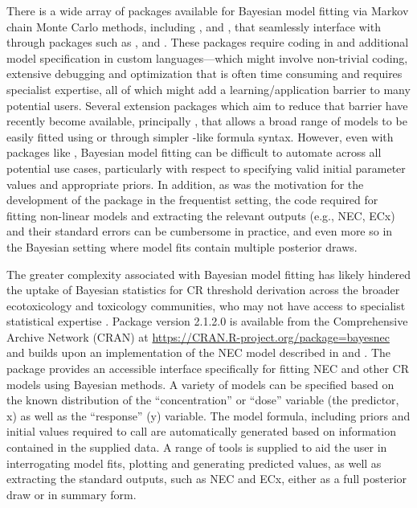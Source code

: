 \documentclass[
  shortnames]{jss}
\begin{document}
There is a wide array of packages available for Bayesian model fitting via Markov chain Monte Carlo methods, including  \citep{Lunn2000},  \citep{Plummer2003} and  \citep{Carpenter2017}, that seamlessly interface with  through packages such as ,  \citep{Su2015} and  \citep{rstan2021}. These packages require coding in  and additional model specification in custom languages---which might involve non-trivial coding, extensive debugging and optimization that is often time consuming and requires specialist expertise, all of which might add a learning/application barrier to many potential users. Several extension packages which aim to reduce that barrier have recently become available, principally  \citep{Burkner2017}, that allows a broad range of models to be easily fitted using  \citep{rstan2021} or  \citep{cmdstanr2022} through simpler -like formula syntax. However, even with packages like , Bayesian model fitting can be difficult to automate across all potential use cases, particularly with respect to specifying valid initial parameter values and appropriate priors. In addition, as was the motivation for the development of the  package in the frequentist setting, the  code required for fitting non-linear models and extracting the relevant outputs (e.g., NEC, ECx) and their standard errors can be cumbersome in practice, and even more so in the Bayesian setting where model fits contain multiple posterior draws.

The greater complexity associated with Bayesian model fitting has likely hindered the uptake of Bayesian statistics for CR threshold derivation across the broader ecotoxicology and toxicology communities, who may not have access to specialist statistical expertise \citep{Fisher2019}. Package  \citep{pkg:bayesnec} version 2.1.2.0 is available from the Comprehensive
 Archive Network (CRAN) at \url{https://CRAN.R-project.org/package=bayesnec} and builds upon an implementation of the NEC model described in \citet{Fox2010} and \citet{Pires2002}. The  package provides an accessible interface specifically for fitting NEC and other CR models using Bayesian methods. A variety of models can be specified based on the known distribution of the ``concentration'' or ``dose'' variable (the predictor, x) as well as the ``response'' (y) variable. The model formula, including priors and initial values required to call  are automatically generated based on information contained in the supplied data. A range of tools is supplied to aid the user in interrogating model fits, plotting and generating predicted values, as well as extracting the standard outputs, such as NEC and ECx, either as a full posterior draw or in summary form.
\end{document}
